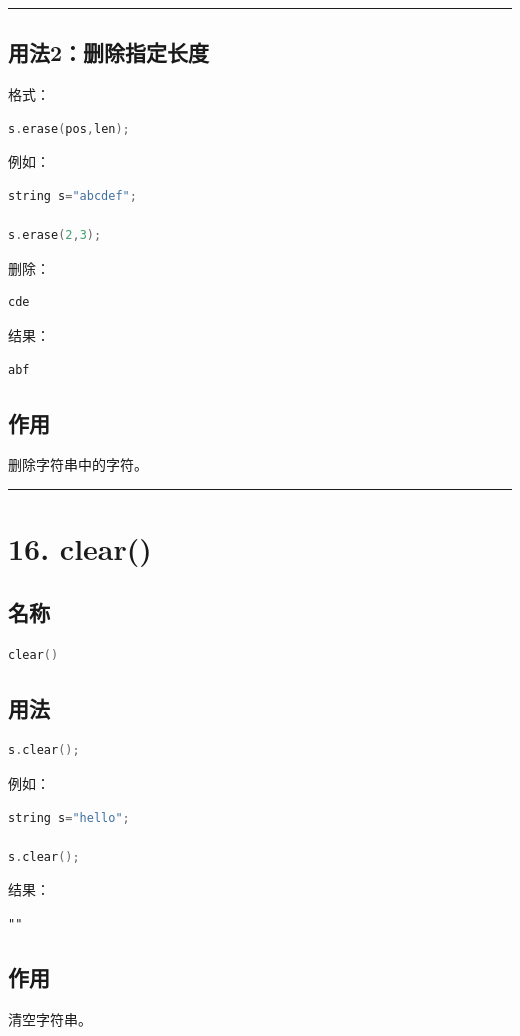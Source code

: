 \documentclass[9pt,twocolumn]{extarticle}
\begin{document}
\noindent\rule{\linewidth}{0.4pt}

\subsection{用法2：删除指定长度}
格式：
\begin{lstlisting}[language=C++]
s.erase(pos,len);
\end{lstlisting}
例如：
\begin{lstlisting}[language=C++]
string s="abcdef";

s.erase(2,3);
\end{lstlisting}
删除：
\begin{lstlisting}
cde
\end{lstlisting}
结果：
\begin{lstlisting}
abf
\end{lstlisting}

\subsection{作用}
删除字符串中的字符。

\noindent\rule{\linewidth}{0.4pt}

\section{16. clear()}

\subsection{名称}
\begin{lstlisting}[language=C++]
clear()
\end{lstlisting}

\subsection{用法}
\begin{lstlisting}[language=C++]
s.clear();
\end{lstlisting}
例如：
\begin{lstlisting}[language=C++]
string s="hello";

s.clear();
\end{lstlisting}
结果：
\begin{lstlisting}
""
\end{lstlisting}

\subsection{作用}
清空字符串。
\end{document}
